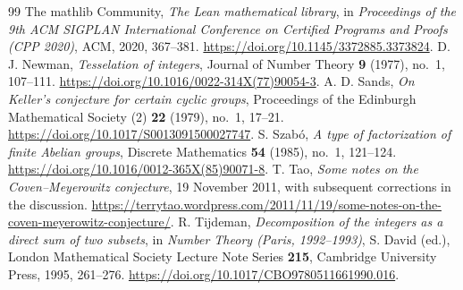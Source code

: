 \documentclass[11pt]{article}
\begin{document}
\begin{thebibliography}{99}
 The mathlib Community, \emph{The Lean mathematical library}, in \emph{Proceedings of the 9th ACM SIGPLAN International Conference on Certified Programs and Proofs (CPP 2020)}, ACM, 2020, 367--381. \url{https://doi.org/10.1145/3372885.3373824}.
 D. J. Newman, \emph{Tesselation of integers}, Journal of Number Theory \textbf{9} (1977), no.~1, 107--111. \url{https://doi.org/10.1016/0022-314X(77)90054-3}.
 A. D. Sands, \emph{On Keller's conjecture for certain cyclic groups}, Proceedings of the Edinburgh Mathematical Society (2) \textbf{22} (1979), no.~1, 17--21. \url{https://doi.org/10.1017/S0013091500027747}.
 S. Szab\'o, \emph{A type of factorization of finite Abelian groups}, Discrete Mathematics \textbf{54} (1985), no.~1, 121--124. \url{https://doi.org/10.1016/0012-365X(85)90071-8}.
 T. Tao, \emph{Some notes on the Coven--Meyerowitz conjecture}, 19 November 2011, with subsequent corrections in the discussion. \url{https://terrytao.wordpress.com/2011/11/19/some-notes-on-the-coven-meyerowitz-conjecture/}.
 R. Tijdeman, \emph{Decomposition of the integers as a direct sum of two subsets}, in \emph{Number Theory (Paris, 1992--1993)}, S. David (ed.), London Mathematical Society Lecture Note Series \textbf{215}, Cambridge University Press, 1995, 261--276. \url{https://doi.org/10.1017/CBO9780511661990.016}.
\end{thebibliography}
\end{document}
